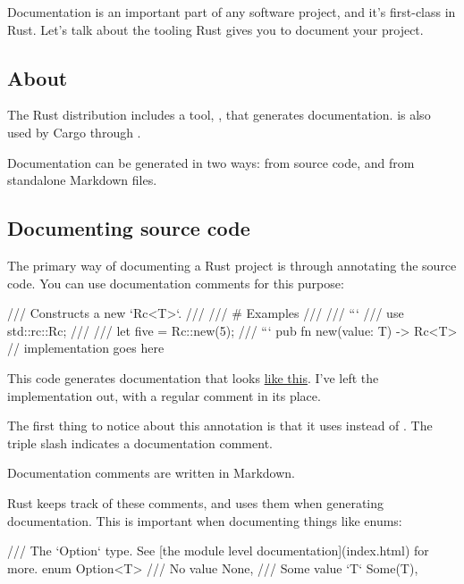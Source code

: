 Documentation is an important part of any software project, and it's first-class in Rust. Let's talk about the tooling Rust gives 
you to document your project.

\subsection*{About }

The Rust distribution includes a tool, , that generates documentation.  is also used by Cargo through 
.

\blank

Documentation can be generated in two ways: from source code, and from standalone Markdown files.

\subsection*{Documenting source code}

The primary way of documenting a Rust project is through annotating the source code. You can use documentation comments for this purpose:

\begin{rustc}
/// Constructs a new `Rc<T>`.
///
/// # Examples
///
/// ```
/// use std::rc::Rc;
///
/// let five = Rc::new(5);
/// ```
pub fn new(value: T) -> Rc<T> {
    // implementation goes here
}
\end{rustc}

This code generates documentation that looks \href{https://doc.rust-lang.org/nightly/std/rc/struct.Rc.html#method.new}{like this}. 
I've left the implementation out, with a regular comment in its place.

\blank

The first thing to notice about this annotation is that it uses \code{///} instead of \code{//}. The triple slash indicates a 
documentation comment.

\blank

Documentation comments are written in Markdown.

\blank

Rust keeps track of these comments, and uses them when generating documentation. This is important when documenting things like enums:

\begin{rustc}
/// The `Option` type. See [the module level documentation](index.html) for more.
enum Option<T> {
    /// No value
    None,
    /// Some value `T`
    Some(T),
}
\end{rustc}

